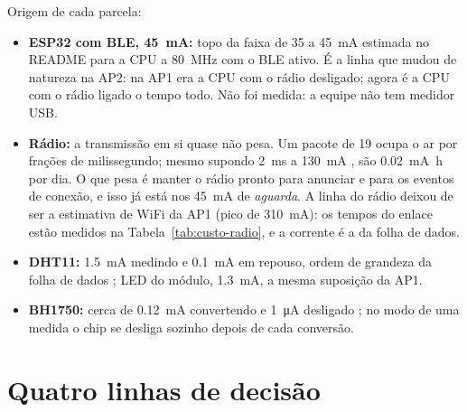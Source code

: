 Origem de cada parcela:

\begin{itemize}
  \item \textbf{ESP32 com BLE, \SI{45}{\milli\ampere}:} topo da faixa de 35
    a \SI{45}{\milli\ampere} estimada no README para a CPU a
    \SI{80}{\mega\hertz} com o BLE ativo. É a linha que mudou de natureza
    na AP2: na AP1 era a CPU com o rádio desligado; agora é a CPU com o
    rádio ligado o tempo todo. Não foi medida: a equipe não tem medidor
    USB.
  \item \textbf{Rádio:} a transmissão em si quase não pesa. Um pacote de
    \SI{19}{\byte} ocupa o ar por frações de milissegundo; mesmo
    supondo \SI{2}{\milli\second} a \SI{130}{\milli\ampere}
    \cite{espressif2023}, são \SI{0.02}{\milli\ampere\hour} por dia. O que
    pesa é manter o rádio pronto para anunciar e para os eventos de
    conexão, e isso já está nos \SI{45}{\milli\ampere} de \emph{aguarda}.
    A linha do rádio deixou de ser a estimativa de WiFi da AP1 (pico de
    \SI{310}{\milli\ampere}): os tempos do enlace estão medidos na
    Tabela~\ref{tab:custo-radio}, e a corrente é a da folha de dados.
  \item \textbf{DHT11:} \SI{1.5}{\milli\ampere} medindo e
    \SI{0.1}{\milli\ampere} em repouso, ordem de grandeza da folha de dados
    \cite{aosongdht11}; LED do módulo, \SI{1.3}{\milli\ampere}, a mesma
    suposição da AP1.
  \item \textbf{BH1750:} cerca de \SI{0.12}{\milli\ampere} convertendo e
    \SI{1}{\micro\ampere} desligado \cite{rohmbh1750}; no modo de uma
    medida o chip se desliga sozinho depois de cada conversão.
\end{itemize}

\section*{Quatro linhas de decisão}
{}

